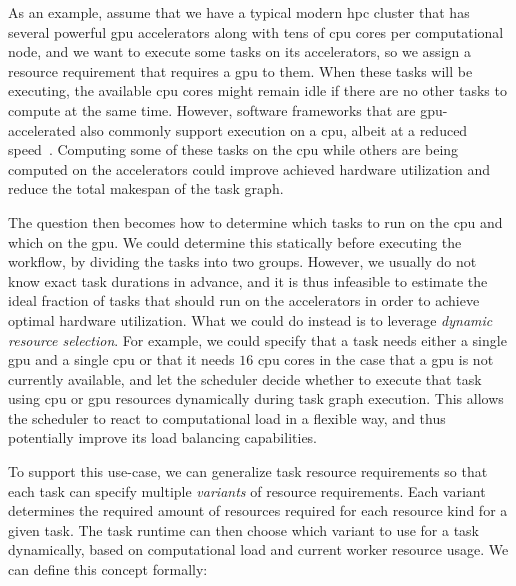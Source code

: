 As an example, assume that we have a typical modern \gls{hpc} cluster that has several powerful \gls{gpu} accelerators along with tens of \gls{cpu} cores per computational node, and we want to execute some tasks on its accelerators, so we assign a resource requirement that requires a \gls{gpu} to them. When these tasks will be executing, the available \gls{cpu} cores might remain idle if there are no other tasks to compute at the same time. However, software frameworks that are \gls{gpu}-accelerated also
commonly support execution on a \gls{cpu}, albeit at a reduced
speed~\cite{gromacs,tensorflow}. Computing some of these tasks on the \gls{cpu} while others
are being computed on the accelerators could improve achieved hardware utilization and reduce
the total makespan of the task graph.

The question then becomes how to determine which tasks to run on the \gls{cpu} and which on
the \gls{gpu}. We could determine this statically before executing the workflow, by dividing the
tasks into two groups. However, we usually do not know exact task durations in advance, and it is
thus infeasible to estimate the ideal fraction of tasks that should run on the accelerators in order
to achieve optimal hardware utilization. What we could do instead is to leverage
\emph{dynamic resource selection}. For example, we could specify that a task needs either
a single \gls{gpu} and a single \gls{cpu} or that it needs
$16$ \gls{cpu} cores in the case that a \gls{gpu} is not currently available, and let the scheduler
decide whether to execute that task using \gls{cpu} or \gls{gpu} resources dynamically during
task graph execution. This allows the scheduler to react to
computational load in a flexible way, and thus potentially improve its load balancing capabilities.

To support this use-case, we can generalize task resource requirements so that each task can
specify multiple \emph{variants} of resource requirements. Each variant determines the
required amount of resources required for each resource kind for a given task. The task runtime can then
choose which variant to use for a task dynamically, based on computational load and current
worker resource usage. We can define this concept formally:


